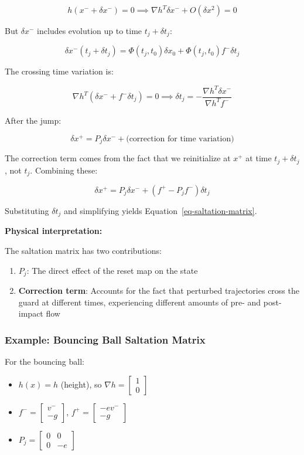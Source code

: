 \documentclass[
  letterpaper,
  DIV=11,
  numbers=noendperiod]{scrartcl}
\providecommand{\tightlist}{%
  \setlength{\itemsep}{0pt}\setlength{\parskip}{0pt}}\usepackage{longtable,booktabs,array}
\begin{document}
\[
h(x^- + \delta x^-) = 0 \implies \nabla h^T \delta x^- + O(\delta x^2) = 0
\]

But \(\delta x^-\) includes evolution up to time \(t_j + \delta t_j\):

\[
\delta x^-(t_j + \delta t_j) = \Phi(t_j, t_0)\delta x_0 + \Phi(t_j, t_0) f^- \delta t_j
\]

The crossing time variation is:

\[
\nabla h^T (\delta x^- + f^- \delta t_j) = 0 \implies \delta t_j = -\frac{\nabla h^T \delta x^-}{\nabla h^T f^-}
\]

After the jump:

\[
\delta x^+ = P_j \delta x^- + \text{(correction for time variation)}
\]

The correction term comes from the fact that we reinitialize at \(x^+\)
at time \(t_j + \delta t_j\), not \(t_j\). Combining these:

\[
\delta x^+ = P_j \delta x^- + (f^+ - P_j f^-) \delta t_j
\]

Substituting \(\delta t_j\) and simplifying yields
Equation~\ref{eq-saltation-matrix}.

\textbf{Physical interpretation:}

The saltation matrix has two contributions:

\begin{enumerate}
\def\labelenumi{\arabic{enumi}.}
\tightlist
\item
  \textbf{\(P_j\)}: The direct effect of the reset map on the state
\item
  \textbf{Correction term}: Accounts for the fact that perturbed
  trajectories cross the guard at different times, experiencing
  different amounts of pre- and post-impact flow
\end{enumerate}

\subsubsection{Example: Bouncing Ball Saltation
Matrix}\label{example-bouncing-ball-saltation-matrix}

For the bouncing ball:

\begin{itemize}
\tightlist
\item
  \(h(x) = h\) (height), so
  \(\nabla h = \begin{bmatrix} 1 \\ 0 \end{bmatrix}\)
\item
  \(f^- = \begin{bmatrix} v^- \\ -g \end{bmatrix}\),
  \(f^+ = \begin{bmatrix} -ev^- \\ -g \end{bmatrix}\)
\item
  \(P_j = \begin{bmatrix} 0 & 0 \\ 0 & -e \end{bmatrix}\)
\end{itemize}
\end{document}
